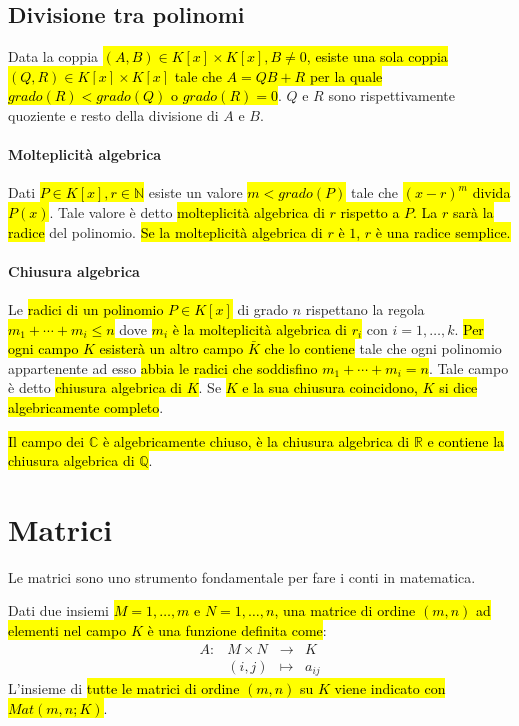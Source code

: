\documentclass[a4paper,12pt,oneside]{article}
\begin{document}
\subsection{Divisione tra polinomi}
Data la coppia \hl{$(A, B) \in K[x] \times K[x], B \neq 0$, esiste una sola coppia
$(Q, R) \in K[x] \times K[x]$ tale che $A = QB + R$ per la quale $grado(R) < grado(Q)$
o $grado(R) = 0$}. $Q$ e $R$ sono rispettivamente quoziente e resto della divisione
di $A$ e $B$.

\paragraph{Molteplicità algebrica} Dati \hl{$P \in K[x], r \in \mathbb{N}$} esiste
un valore \hl{$m < grado(P)$} tale che \hl{${(x-r)}^m$ divida $P(x)$}. Tale valore è
detto \hl{molteplicità algebrica di $r$ rispetto a $P$. La $r$ sarà la radice} del
polinomio. \hl{Se la molteplicità algebrica di $r$ è $1$, $r$ è una radice semplice.}

\paragraph{Chiusura algebrica} Le \hl{radici di un polinomio $P \in K[x]$} di grado
$n$ rispettano la regola \\ \hl{$m_1 + \cdots + m_i \leq n$} dove \hl{$m_i$ è la
molteplicità algebrica di $r_i$} con $i = 1, \ldots, k$. \hl{Per ogni campo $K$
esisterà un altro campo $\bar{K}$ che lo contiene} tale che ogni polinomio
appartenente ad esso \hl{abbia le radici che soddisfino $m_1 + \cdots + m_i = n$}.
Tale campo è detto \hl{chiusura algebrica di $K$}. Se \hl{$K$ e la sua chiusura
coincidono, $K$ si dice algebricamente completo}.

\hl{Il campo dei $\mathbb{C}$ è algebricamente chiuso, è la chiusura algebrica di
$\mathbb{R}$ e contiene la chiusura algebrica di $\mathbb{Q}$}.

\section{Matrici}
Le matrici sono uno strumento fondamentale per fare i conti in matematica.

Dati due insiemi \hl{$M = {1, \ldots, m}$ e $N = {1, \ldots, n}$, una matrice di
ordine $(m, n)$ ad elementi nel campo $K$ è una funzione definita come}:
\[
    \begin{array}{cccc}
        A: &M \times N &\to &K \\
        &(i,j) &\mapsto &a_{ij}
    \end{array}
\]
L'insieme di \hl{tutte le matrici di ordine $(m,n)$ su $K$ viene indicato con
$Mat(m,n;K)$}.
\end{document}
